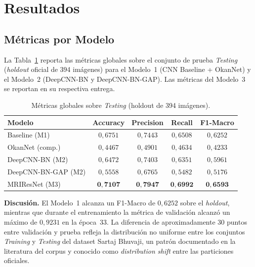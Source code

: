 \section{Resultados}

\subsection{Métricas por Modelo}
\label{sec:metricas-modelo}

La Tabla~\ref{tab:metricas-global} reporta las métricas globales
sobre el conjunto de prueba \textit{Testing} (\textit{holdout}
oficial de 394 imágenes) para el Modelo~1 (CNN Baseline +
OkanNet) y el Modelo~2 (DeepCNN-BN y DeepCNN-BN-GAP). Las
métricas del Modelo~3 se reportan en su respectiva entrega.

\begin{table}[!t]
\centering
\caption{Métricas globales sobre \textit{Testing} (holdout de
394 imágenes).}
\label{tab:metricas-global}
\renewcommand{\arraystretch}{1.15}
\footnotesize
\begin{tabular}{@{}lcccc@{}}
\toprule
\textbf{Modelo} & \textbf{Accuracy} & \textbf{Precision} &
\textbf{Recall} & \textbf{F1-Macro} \\
\midrule
Baseline (M1)         & $0{,}6751$ & $0{,}7443$ & $0{,}6508$ & $0{,}6252$ \\
OkanNet (comp.)       & $0{,}4467$ & $0{,}4901$ & $0{,}4634$ & $0{,}4233$ \\
DeepCNN-BN (M2)       & $0{,}6472$ & $0{,}7403$ & $0{,}6351$ & $0{,}5961$ \\
DeepCNN-BN-GAP (M2)   & $0{,}5558$ & $0{,}6765$ & $0{,}5482$ & $0{,}5176$ \\
MRIResNet (M3)        & $\mathbf{0{,}7107}$ & $\mathbf{0{,}7947}$ & $\mathbf{0{,}6992}$ & $\mathbf{0{,}6593}$ \\
\bottomrule
\end{tabular}
\end{table}

\noindent\textbf{Discusión.} El Modelo~1 alcanza un F1-Macro de
$0{,}6252$ sobre el \textit{holdout}, mientras que durante el
entrenamiento la métrica de validación alcanzó un máximo de
$0{,}9231$ en la época~$33$. La diferencia de aproximadamente
$30$ puntos entre validación y prueba refleja la distribución
no uniforme entre los conjuntos \textit{Training} y
\textit{Testing} del dataset Sartaj Bhuvaji, un patrón
documentado en la literatura del corpus y conocido como
\textit{distribution shift} entre las particiones oficiales.

